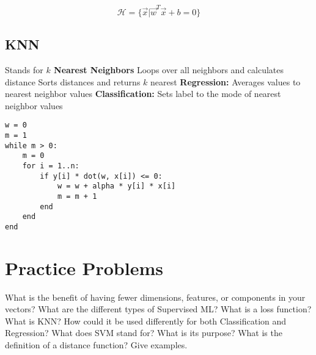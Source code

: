\[
\mathcal{H} = \{\vec{x} | \vec{w}^T\vec{x} + b = 0\}
\]



\subsection{KNN\cite{guo2003knn}}
\begin{outline}
    \1 Stands for \textbf{$k$ Nearest Neighbors}
    \1 Loops over all neighbors and calculates distance
    \1 Sorts distances and returns $k$ nearest
    \1 \textbf{Regression:} Averages values to nearest neighbor values
    \1 \textbf{Classification:} Sets label to the mode of nearest neighbor values
\end{outline}

\begin{verbatim}
w = 0
m = 1
while m > 0:
    m = 0
    for i = 1..n:
        if y[i] * dot(w, x[i]) <= 0:
            w = w + alpha * y[i] * x[i]
            m = m + 1
        end
    end
end
\end{verbatim}

\section{Practice Problems}

\begin{outline}[enumerate]
    \1 What is the benefit of having fewer dimensions, features, or components in your vectors?
    \1 What are the different types of Supervised ML?
    \1 What is a loss function?
    \1 What is KNN? How could it be used differently for both Classification and Regression?
    \1 What does SVM stand for? What is its purpose?
    \1 What is the definition of a distance function? Give examples.
\end{outline}


